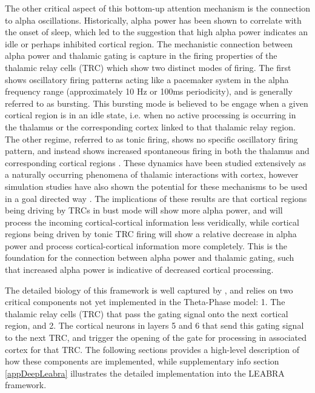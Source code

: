 \documentclass[11pt, titlepage, twoside]{article}
\begin{document}
The other critical aspect of this bottom-up attention mechanism is the connection to alpha oscillations.  Historically, alpha power has been shown to correlate with the onset of sleep, which led to the suggestion that high alpha power indicates an idle or perhaps inhibited cortical region.  The mechanistic connection between alpha power and thalamic gating is capture in the firing properties of the thalamic relay cells (TRC) which show two distinct modes of firing.  The first shows oscillatory firing patterns acting like a pacemaker system in the alpha frequency range (approximately 10 Hz or 100ms periodicity), and is generally referred to as bursting.  This bursting mode is believed to be engage when a given cortical region is in an idle state, i.e. when no active processing is occurring in the thalamus or the corresponding cortex linked to that thalamic relay region.  The other regime, referred to as tonic firing, shows no specific oscillatory firing pattern, and instead shows increased spontaneous firing in both the thalamus and corresponding cortical regions \cite{LerescheLightowlerSolteszEtAl91,ShermanGuillery06,LopesdaSilva91}.  These dynamics have been studied extensively as a naturally occurring phenomena of thalamic interactions with cortex, however simulation studies have also shown the potential for these mechanisms to be used in a goal directed way \cite{HindriksvanPutten13,VijayanKopell12,LeeWhittingtonKopell13}. The implications of these results are that cortical regions being driving by TRCs in bust mode will show more alpha power, and will process the incoming cortical-cortical information less veridically, while cortical regions being driven by tonic TRC firing will show a relative decrease in alpha power and process cortical-cortical information more completely.  This is the foundation for the connection between alpha power and thalamic gating, such that increased alpha power is indicative of decreased cortical processing.

The detailed biology of this framework is well captured by \textcite{ShermanGuillery06}, and relies on two critical components not yet implemented in the Theta-Phase model: 1. The thalamic relay cells (TRC) that pass the gating signal onto the next cortical region, and 2. The cortical neurons in layers 5 and 6 that send this gating signal to the next TRC, and trigger the opening of the gate for processing in associated cortex for that TRC.  The following sections provides a high-level description of how these components are implemented, while supplementary info section \ref{appDeepLeabra} illustrates the detailed implementation into the LEABRA framework.
\end{document}
